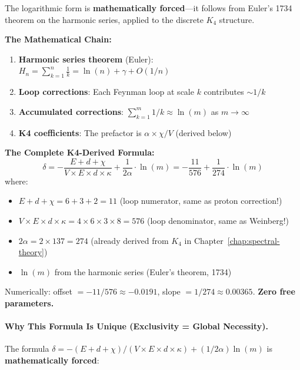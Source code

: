 \documentclass[11pt,a4paper]{book}
\begin{document}
The logarithmic form is \textbf{mathematically forced}---it follows from Euler's 1734 theorem 
on the harmonic series, applied to the discrete $K_4$ structure.

\textbf{The Mathematical Chain:}
\begin{enumerate}
\item \textbf{Harmonic series theorem} (Euler): $H_n = \sum_{k=1}^n \frac{1}{k} = \ln(n) + \gamma + O(1/n)$
\item \textbf{Loop corrections}: Each Feynman loop at scale $k$ contributes $\sim 1/k$
\item \textbf{Accumulated corrections}: $\sum_{k=1}^m 1/k \approx \ln(m)$ as $m \to \infty$
\item \textbf{K4 coefficients}: The prefactor is $\alpha \times \chi/V$ (derived below)
\end{enumerate}

\textbf{The Complete K4-Derived Formula:}
\[
\delta = -\frac{E + d + \chi}{V \times E \times d \times \kappa} + \frac{1}{2\alpha} \cdot \ln(m) = -\frac{11}{576} + \frac{1}{274} \cdot \ln(m)
\]
where:
\begin{itemize}
\item $E + d + \chi = 6 + 3 + 2 = 11$ (loop numerator, same as proton correction!)
\item $V \times E \times d \times \kappa = 4 \times 6 \times 3 \times 8 = 576$ (loop denominator, same as Weinberg!)
\item $2\alpha = 2 \times 137 = 274$ (already derived from $K_4$ in Chapter~\ref{chap:spectral-theory})
\item $\ln(m)$ from the harmonic series (Euler's theorem, 1734)
\end{itemize}

Numerically: offset $= -11/576 \approx -0.0191$, slope $= 1/274 \approx 0.00365$. \textbf{Zero free parameters.}

\paragraph{Why This Formula Is Unique (Exclusivity = Global Necessity).}

The formula $\delta = -(E + d + \chi)/(V \times E \times d \times \kappa) + (1/2\alpha)\ln(m)$ is \textbf{mathematically forced}:
\end{document}
